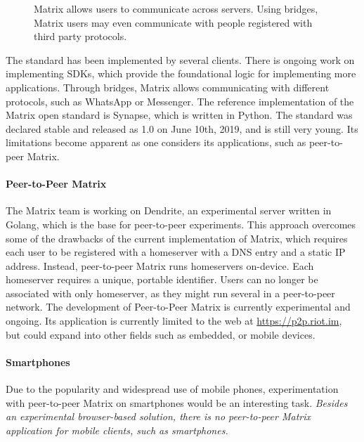\begin{figure}
    \centering
    \resizebox{0.7\linewidth}{!}{}
    \caption{Matrix allows users to communicate across servers. Using bridges, Matrix users may even communicate with people registered with third party protocols.}
    \label{fig:matrix_structure}
\end{figure}

The standard has been implemented by several clients\cite{matrix_org_clients}.
There is ongoing work on implementing SDKs\cite{matrix_org_sdks}, which provide the foundational logic for implementing more applications.
Through bridges, Matrix allows communicating with different protocols\cite{matrix_org_bridges}, such as WhatsApp or Messenger.
The reference implementation of the Matrix open standard is Synapse\cite{matrix_org_synapse}, which is written in Python.
The standard was declared stable and released as 1.0 on June 10th, 2019\cite{matrix_org_spec}, and is still very young.
Its limitations become apparent as one considers its applications, such as peer-to-peer Matrix.


\paragraph{Peer-to-Peer Matrix}
The Matrix team is working on Dendrite\cite{matrix_org_dendrite}, an experimental server written in Golang, which is the base for peer-to-peer experiments.
This approach overcomes some of the drawbacks of the current implementation of Matrix, which requires each user to be registered with a homeserver with a DNS entry and a static IP address.
Instead, peer-to-peer Matrix runs homeservers on-device.
Each homeserver requires a unique, portable identifier.
Users can no longer be associated with only homeserver, as they might run several in a peer-to-peer network.
The development of Peer-to-Peer Matrix is currently experimental and ongoing.
Its application is currently limited to the web at \url{https://p2p.riot.im}, but could expand into other fields such as embedded, or mobile devices.


\paragraph{Smartphones}
Due to the popularity and widespread use of mobile phones, experimentation with peer-to-peer Matrix on smartphones would be an interesting task.
\textit{Besides an experimental browser-based solution\cite{fosdem_event_p2p_matrix}, there is no peer-to-peer Matrix application for mobile clients, such as smartphones.}

